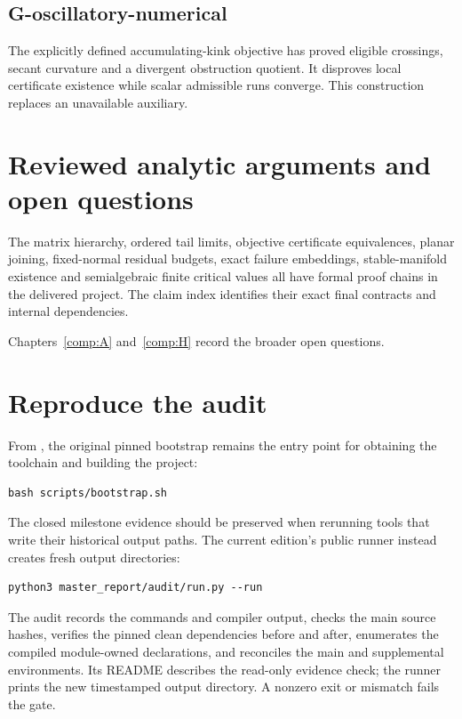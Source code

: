 \subsection{G-oscillatory-numerical}\label{g-oscillatory-numerical}

The explicitly defined accumulating-kink objective has proved eligible crossings, secant curvature and a divergent obstruction quotient. It disproves local certificate existence while scalar admissible runs converge. This construction replaces an unavailable auxiliary.



\section{Reviewed analytic arguments and open questions}\label{analytic-steps-that-still-require-independent-review}

The matrix hierarchy, ordered tail limits, objective certificate equivalences, planar joining, fixed-normal residual budgets, exact failure embeddings, stable-manifold existence and semialgebraic finite critical values all have formal proof chains in the delivered project. The claim index identifies their exact final contracts and internal dependencies.

Chapters~\ref{comp:A} and~\ref{comp:H} record the broader open questions.



\section{Reproduce the audit}\label{reproduce-the-audit}

From , the original pinned bootstrap remains the entry point for obtaining the toolchain and building the project:
\begin{verbatim}
bash scripts/bootstrap.sh
\end{verbatim}
The closed milestone evidence should be preserved when rerunning tools that write their historical output paths. The current edition's public runner instead creates fresh output directories:
\begin{verbatim}
python3 master_report/audit/run.py --run
\end{verbatim}
The audit records the commands and compiler output, checks the main source hashes, verifies the pinned clean dependencies before and after, enumerates the compiled module-owned declarations, and reconciles the main and supplemental environments. Its README describes the read-only evidence check; the runner prints the new timestamped output directory. A nonzero exit or mismatch fails the gate.

